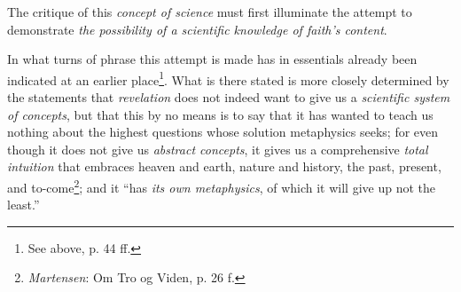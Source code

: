\documentclass[12pt,a4paper]{book}
\begin{document}
The critique of this \emph{concept of science} must first illuminate the attempt to
demonstrate \emph{the possibility of a scientific knowledge of faith's content}.

In what turns of phrase this attempt is made has in essentials already been indicated at an
earlier place\footnote{See above, p. 44 ff.}. What is there stated is more closely determined
by the statements that \emph{revelation} does not indeed want to give us a \emph{scientific system of
concepts}, but that this by no means is to say that it has wanted to teach us nothing about the
highest questions whose solution metaphysics seeks; for even though it does not give us
\emph{abstract concepts}, it gives us a comprehensive \emph{total intuition} that embraces
heaven and earth, nature and history, the past, present, and to-come\footnote{\emph{Martensen}: Om
Tro og Viden, p. 26 f.}; and it ``has \emph{its own metaphysics}, of which it will give up not the
least.''
\end{document}
